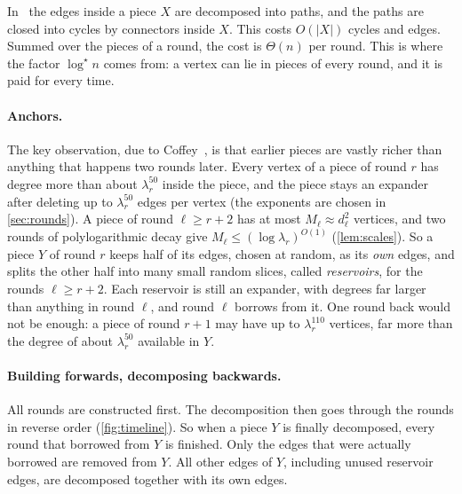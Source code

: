 \documentclass[11pt]{article}
\theoremstyle{definition}
\theoremstyle{remark}
\numberwithin{equation}{section}
\numberwithin{figure}{section}
\numberwithin{table}{section}
\begin{document}
In~\cite{BM} the edges inside a piece $X$ are decomposed into paths, and the
paths are closed into cycles by connectors inside $X$. This costs $O(|X|)$
cycles and edges. Summed over the pieces of a round, the cost is $\Theta(n)$ per
round. This is where the factor $\log^\star n$ comes from: a vertex can lie in
pieces of every round, and it is paid for every time.

\paragraph{Anchors.} The key observation, due to Coffey~\cite{Cof}, is that
earlier pieces are vastly richer than anything that happens two rounds later.
Every vertex of a piece of round $r$ has degree more than about
$\lambda_r^{50}$ inside the piece, and the piece stays an expander after
deleting up to $\lambda_r^{50}$ edges per vertex (the exponents are chosen in
\cref{sec:rounds}). A piece of round $\ell\ge r+2$ has at most
$M_\ell\approx d_\ell^2$ vertices, and two rounds of polylogarithmic decay give
$M_\ell\le(\log\lambda_r)^{O(1)}$ (\cref{lem:scales}). So a piece $Y$ of round
$r$ keeps half of its edges, chosen at random, as its \emph{own} edges, and
splits the other half into many small random slices, called
\emph{reservoirs}, for the rounds $\ell\ge r+2$. Each reservoir is still an
expander, with degrees far larger than anything in round $\ell$, and round
$\ell$ borrows from it. One round back would not be enough: a piece of round
$r+1$ may have up to $\lambda_r^{110}$ vertices, far more than the degree of
about $\lambda_r^{50}$ available in $Y$.

\paragraph{Building forwards, decomposing backwards.} All rounds are
constructed first. The decomposition then goes through the rounds in reverse
order (\cref{fig:timeline}). So when a piece $Y$ is finally decomposed, every
round that borrowed from $Y$ is finished. Only the edges that were actually
borrowed are removed from $Y$. All other edges of $Y$, including unused
reservoir edges, are decomposed together with its own edges.
\end{document}
